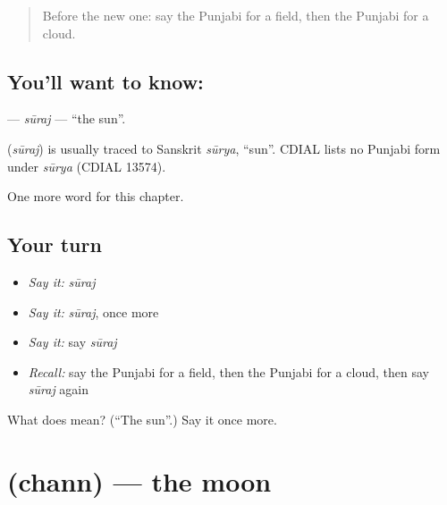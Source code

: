 \label{lesson:PA-C75-suraj}



\begin{quote}
Before the new one: say the Punjabi for a field, then the Punjabi for a cloud.
\end{quote}

\subsection*{You'll want to know: }
\textbf{} — \emph{sūraj} — \textquotedblleft{}the sun\textquotedblright{}.

\begin{cousinweb}
\textbf{} (\emph{sūraj}) is usually traced to Sanskrit \emph{sūrya}, \textquotedblleft{}sun\textquotedblright{}. CDIAL lists no Punjabi form under \emph{sūrya} (CDIAL 13574).
\end{cousinweb}

\begin{grammarlens}[title={What you've built}]
One more word for this chapter.
\end{grammarlens}

\subsection*{Your turn}
\begin{itemize}
\raggedright
  \item \emph{Say it:} \emph{sūraj}
  \item \emph{Say it:} \emph{sūraj}, once more
  \item \emph{Say it:} say \emph{sūraj}
  \item \emph{Recall:} say the Punjabi for a field, then the Punjabi for a cloud, then say \emph{sūraj} again
\end{itemize}

\begin{tcolorbox}[breakable,colback=teal!4,colframe=teal!35!black,title={Before you move on}]
What does  mean? (\textquotedblleft{}The sun\textquotedblright{}.) Say it once more.
\end{tcolorbox}
\section[\texorpdfstring{\pa{ਚੰਨ} (chann)}{ਚੰਨ (chann)}]{ (chann) — the moon}

\label{lesson:PA-C75-chann}




